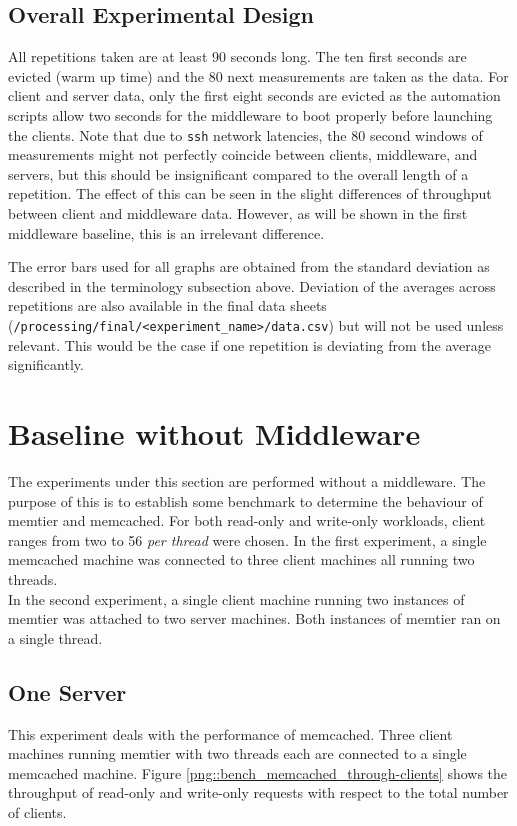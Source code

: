 \documentclass[11pt,a4paper]{article}
\begin{document}
\subsection{Overall Experimental Design}
All repetitions taken are at least 90 seconds long. The ten first seconds are evicted (warm up time) and the 80 next measurements are taken as the data. For client and server data, only the first eight seconds are evicted as the automation scripts allow two seconds for the middleware to boot properly before launching the clients. Note that due to \texttt{ssh} network latencies, the 80 second windows of measurements might not perfectly coincide between clients, middleware, and servers, but this should be insignificant compared to the overall length of a repetition. The effect of this can be seen in the slight differences of throughput between client and middleware data. However, as will be shown in the first middleware baseline, this is an irrelevant difference.

The error bars used for all graphs are obtained from the standard deviation as described in the terminology subsection above. Deviation of the averages across repetitions are also available in the final data sheets (\texttt{/processing/final/<experiment_name>/data.csv}) but will not be used unless relevant. This would be the case if one repetition is deviating from the average significantly.






\newpage

\section{Baseline without Middleware}
The experiments under this section are performed without a middleware. The purpose of this is to establish some benchmark to determine the behaviour of memtier and memcached. For both read-only and write-only workloads, client ranges from two to 56 \textit{per thread} were chosen. In the first experiment, a single memcached machine was connected to three client machines all running two threads.\\
In the second experiment, a single client machine running two instances of memtier was attached to two server machines. Both instances of memtier ran on a single thread.

\subsection{One Server}
This experiment deals with the performance of memcached. Three client machines running memtier with two threads each are connected to a single memcached machine. Figure \ref{png::bench_memcached_through-clients} shows the throughput of read-only and write-only requests with respect to the total number of clients.
\end{document}
